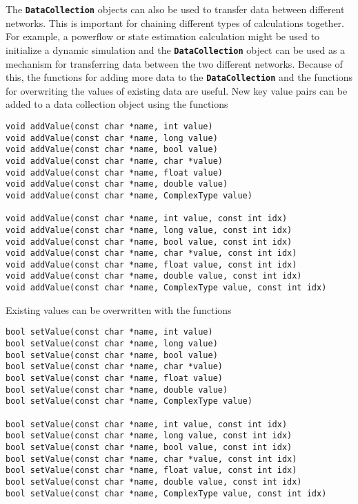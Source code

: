 The \texttt{\textbf{DataCollection}} objects can also be used to transfer data between different networks. This is important for chaining different types of calculations together. For example, a powerflow or state estimation calculation might be used to initialize a dynamic simulation and the \texttt{\textbf{DataCollection}} object can be used as a mechanism for transferring data between the two different networks. Because of this, the functions for adding more data to the \texttt{\textbf{DataCollection}} and the functions for overwriting the values of existing data are useful. New key value pairs can be added to a data collection object using the functions

{
\color{red}
\begin{Verbatim}[fontseries=b]
void addValue(const char *name, int value)
void addValue(const char *name, long value)
void addValue(const char *name, bool value)
void addValue(const char *name, char *value)
void addValue(const char *name, float value)
void addValue(const char *name, double value)
void addValue(const char *name, ComplexType value)

void addValue(const char *name, int value, const int idx)
void addValue(const char *name, long value, const int idx)
void addValue(const char *name, bool value, const int idx)
void addValue(const char *name, char *value, const int idx)
void addValue(const char *name, float value, const int idx)
void addValue(const char *name, double value, const int idx)
void addValue(const char *name, ComplexType value, const int idx)
\end{Verbatim}
}

Existing values can be overwritten with the functions

{
\color{red}
\begin{Verbatim}[fontseries=b]
bool setValue(const char *name, int value)
bool setValue(const char *name, long value)
bool setValue(const char *name, bool value)
bool setValue(const char *name, char *value)
bool setValue(const char *name, float value)
bool setValue(const char *name, double value)
bool setValue(const char *name, ComplexType value)

bool setValue(const char *name, int value, const int idx)
bool setValue(const char *name, long value, const int idx)
bool setValue(const char *name, bool value, const int idx)
bool setValue(const char *name, char *value, const int idx)
bool setValue(const char *name, float value, const int idx)
bool setValue(const char *name, double value, const int idx)
bool setValue(const char *name, ComplexType value, const int idx)
\end{Verbatim}
}
